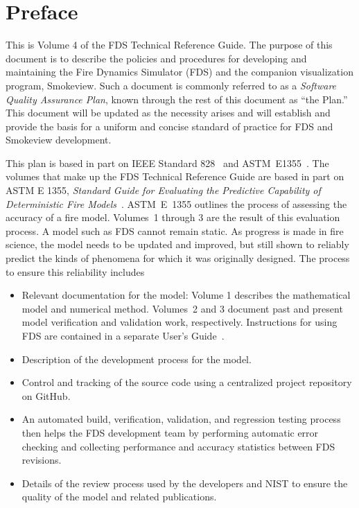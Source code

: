 \documentclass[11pt]{book}
\begin{document}
\newpage


\frontmatter

\pagestyle{plain}




\chapter{Preface}

This is Volume 4 of the FDS Technical Reference Guide. The purpose of this document is to describe the policies and procedures for developing and maintaining the Fire Dynamics
Simulator (FDS) and the companion visualization program, Smokeview. Such a document is commonly referred to as a {\em Software Quality Assurance Plan}, known through the rest of this document as ``the Plan.'' This document will be updated as the necessity arises and will establish and provide the basis for a uniform and concise standard of practice for FDS and Smokeview development.

This plan is based in part on IEEE Standard 828~\cite{IEEE-828} and ASTM~E1355~\cite{ASTM:E1355}. The volumes that make up the FDS Technical Reference Guide are based in part on ASTM E 1355, {\em Standard Guide for Evaluating the Predictive Capability of
Deterministic Fire Models}~\cite{ASTM:E1355}. ASTM~E~1355 outlines the process of assessing the accuracy of a fire model. Volumes~1 through 3 are the result of this evaluation process. A model such as FDS cannot remain static. As progress is made in fire science, the model needs to be updated and improved, but still shown to reliably predict the kinds of phenomena for which it was originally designed. The process to ensure this reliability includes

\begin{itemize}
    \item Relevant documentation for the model: Volume 1 describes the mathematical model and numerical method. Volumes~2 and 3 document past and present model verification and validation work, respectively. Instructions for using FDS are contained in a separate User's Guide~\cite{FDS_Users_Guide}.

    \item Description of the development process for the model.

    \item Control and tracking of the source code using a centralized project repository on GitHub.

    \item An automated build, verification, validation, and regression testing process then helps the FDS development team by performing automatic error checking and collecting performance and accuracy statistics between FDS revisions.

    \item Details of the review process used by the developers and NIST to ensure the quality of the model and related publications.

\end{itemize}
\end{document}
